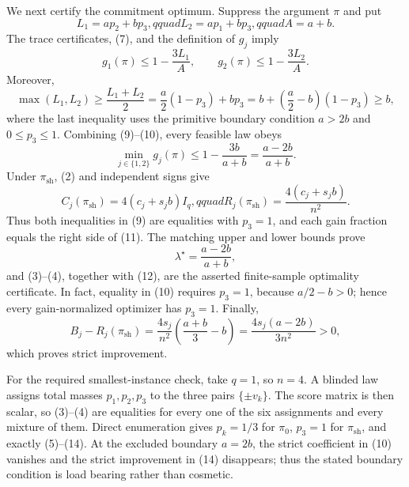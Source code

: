 We next certify the commitment optimum.  Suppress the argument \(\pi\) and put
\[
L_1=ap_2+bp_3,qquad L_2=ap_1+bp_3,qquad A=a+b. \tag{8}
\]
The trace certificates, (7), and the definition of \(g_j\) imply
\[
g_1(\pi)\le1-\frac{3L_1}{A},
\qquad
g_2(\pi)\le1-\frac{3L_2}{A}. \tag{9}
\]
Moreover,
\[
\max(L_1,L_2)
\ge\frac{L_1+L_2}{2}
=\frac a2(1-p_3)+bp_3
=b+\left(\frac a2-b\right)(1-p_3)
\ge b, \tag{10}
\]
where the last inequality uses the primitive boundary condition \(a>2b\) and \(0\le p_3\le1\).  Combining (9)--(10), every feasible law obeys
\[
\min_{j\in\{1,2\}}g_j(\pi)
\le1-\frac{3b}{a+b}
=\frac{a-2b}{a+b}. \tag{11}
\]
Under \(\pi_{\mathrm{sh}}\), (2) and independent signs give
\[
C_j(\pi_{\mathrm{sh}})=4(c_j+s_jb)I_q,qquad
R_j(\pi_{\mathrm{sh}})=\frac{4(c_j+s_jb)}{n^2}. \tag{12}
\]
Thus both inequalities in (9) are equalities with \(p_3=1\), and each gain fraction equals the right side of (11).  The matching upper and lower bounds prove
\[
\lambda^\star=\frac{a-2b}{a+b}, \tag{13}
\]
and (3)--(4), together with (12), are the asserted finite-sample optimality certificate.  In fact, equality in (10) requires \(p_3=1\), because \(a/2-b>0\); hence every gain-normalized optimizer has \(p_3=1\).  Finally,
\[
B_j-R_j(\pi_{\mathrm{sh}})
=\frac{4s_j}{n^2}\left(\frac{a+b}{3}-b\right)
=\frac{4s_j(a-2b)}{3n^2}>0, \tag{14}
\]
which proves strict improvement.

For the required smallest-instance check, take \(q=1\), so \(n=4\).  A blinded law assigns total masses \(p_1,p_2,p_3\) to the three pairs \(\{\pm v_k\}\).  The score matrix is then scalar, so (3)--(4) are equalities for every one of the six assignments and every mixture of them.  Direct enumeration gives \(p_k=1/3\) for \(\pi_0\), \(p_3=1\) for \(\pi_{\mathrm{sh}}\), and exactly (5)--(14).  At the excluded boundary \(a=2b\), the strict coefficient in (10) vanishes and the strict improvement in (14) disappears; thus the stated boundary condition is load bearing rather than cosmetic.